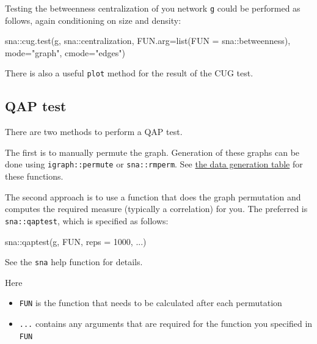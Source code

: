 \documentclass[
]{article}
\newenvironment{Shaded}{\begin{snugshade}}{\end{snugshade}}
\newcommand{\AttributeTok}[1]{\textcolor[rgb]{0.77,0.63,0.00}{#1}}
\newcommand{\DecValTok}[1]{\textcolor[rgb]{0.00,0.00,0.81}{#1}}
\newcommand{\FunctionTok}[1]{\textcolor[rgb]{0.00,0.00,0.00}{#1}}
\newcommand{\NormalTok}[1]{#1}
\newcommand{\SpecialCharTok}[1]{\textcolor[rgb]{0.00,0.00,0.00}{#1}}
\newcommand{\StringTok}[1]{\textcolor[rgb]{0.31,0.60,0.02}{#1}}
\begin{document}
Testing the betweenness centralization of you network \texttt{g} could
be performed as follows, again conditioning on size and density:

\begin{Shaded}
\begin{Highlighting}[]
\NormalTok{sna}\SpecialCharTok{::}\FunctionTok{cug.test}\NormalTok{(g,}
\NormalTok{              sna}\SpecialCharTok{::}\NormalTok{centralization,}
              \AttributeTok{FUN.arg=}\FunctionTok{list}\NormalTok{(}\AttributeTok{FUN =}\NormalTok{ sna}\SpecialCharTok{::}\NormalTok{betweenness),}
              \AttributeTok{mode=}\StringTok{"graph"}\NormalTok{,}
              \AttributeTok{cmode=}\StringTok{"edges"}\NormalTok{)}
\end{Highlighting}
\end{Shaded}

There is also a useful \texttt{plot} method for the result of the CUG
test.

\hypertarget{qap-test}{%
\subsection{QAP test}\label{qap-test}}

There are two methods to perform a QAP test.

The first is to manually permute the graph. Generation of these graphs
can be done using \texttt{igraph::permute} or \texttt{sna::rmperm}. See
\protect\hyperlink{generate}{the data generation table} for these
functions.

The second approach is to use a function that does the graph permutation
and computes the required measure (typically a correlation) for you. The
preferred is \texttt{sna::qaptest}, which is specified as follows:

\begin{Shaded}
\begin{Highlighting}[]
\NormalTok{sna}\SpecialCharTok{::}\FunctionTok{qaptest}\NormalTok{(g, FUN, }\AttributeTok{reps =} \DecValTok{1000}\NormalTok{, ...)}
\end{Highlighting}
\end{Shaded}

See the \texttt{sna} help function for details.

Here

\begin{itemize}
\item
  \texttt{FUN} is the function that needs to be calculated after each
  permutation
\item
  \texttt{...} contains any arguments that are required for the function
  you specified in \texttt{FUN}
\end{itemize}
\end{document}
